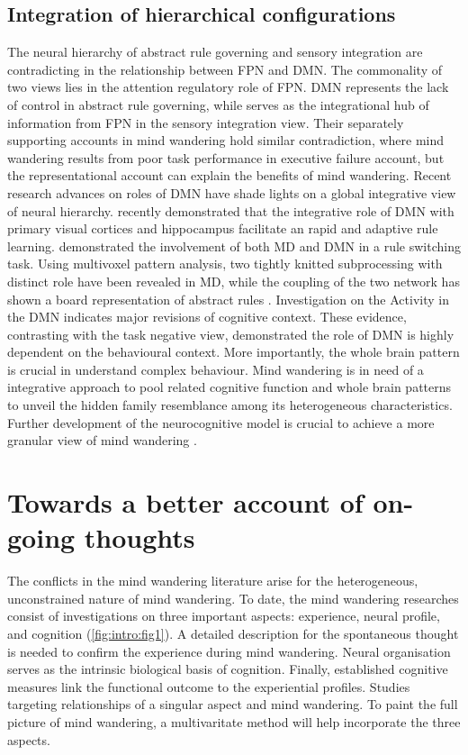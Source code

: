 \subsection{Integration of hierarchical configurations}

The neural hierarchy of abstract rule governing and sensory integration are contradicting in the relationship between FPN and DMN. The commonality of two views lies in the attention regulatory role of FPN. DMN represents the lack of control in abstract rule governing, while serves as the integrational hub of information from FPN in the sensory integration view. Their separately supporting accounts in mind wandering hold similar contradiction, where mind wandering results from poor task performance in executive failure account, but the representational account can explain the benefits of mind wandering. Recent research advances on roles of DMN have shade lights on a global integrative view of neural hierarchy.  recently demonstrated that the integrative role of DMN with primary visual cortices and hippocampus facilitate an rapid and adaptive rule learning. \cite{Crittenden2015,Crittenden2016} demonstrated the involvement of both MD and DMN in a rule switching task. Using multivoxel pattern analysis, two tightly knitted subprocessing with distinct role have been revealed in MD, while the coupling of the two network has shown a board representation of abstract rules \cite{Crittenden2016}. Investigation on the Activity in the DMN indicates major revisions of cognitive context. These evidence, contrasting with the task negative view, demonstrated the role of DMN is highly dependent on the behavioural context. More importantly, the whole brain pattern is crucial in understand complex behaviour. Mind wandering is in need of a integrative approach to pool related cognitive function and whole brain patterns to unveil the hidden family resemblance among its heterogeneous characteristics. Further development of the neurocognitive model is crucial to achieve a more granular view of mind wandering \cite{Mittner2016,SmallwoodFrontiers2013}. 

\section{Towards a better account of on-going thoughts}

The conflicts in the mind wandering literature arise for the heterogeneous, unconstrained nature of mind wandering. To date, the mind wandering researches consist of investigations on three important aspects: experience, neural profile, and cognition (\cref{fig:intro:fig1}). A detailed description for the spontaneous thought is needed to confirm the experience during mind wandering. Neural organisation serves as the intrinsic biological basis of cognition. Finally, established cognitive measures link the functional outcome to the experiential profiles. Studies targeting relationships of a singular aspect and mind wandering. To paint the full picture of mind wandering, a multivaritate method will help incorporate the three aspects. 

